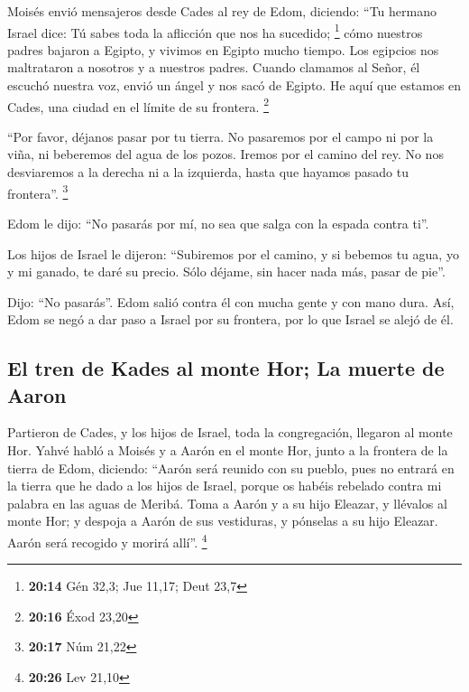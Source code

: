 \begin{paracol}{2}
 Moisés envió mensajeros desde Cades al rey de Edom,
diciendo: ``Tu hermano Israel dice: Tú sabes toda la aflicción que nos
ha sucedido; \footnote{\textbf{20:14} Gén 32,3; Jue 11,17; Deut 23,7}
 cómo nuestros padres bajaron a Egipto, y vivimos en
Egipto mucho tiempo. Los egipcios nos maltrataron a nosotros y a
nuestros padres.  Cuando clamamos al Señor, él escuchó
nuestra voz, envió un ángel y nos sacó de Egipto. He aquí que estamos en
Cades, una ciudad en el límite de su frontera. \footnote{\textbf{20:16}
  Éxod 23,20}

 ``Por favor, déjanos pasar por tu tierra. No pasaremos
por el campo ni por la viña, ni beberemos del agua de los pozos. Iremos
por el camino del rey. No nos desviaremos a la derecha ni a la
izquierda, hasta que hayamos pasado tu frontera''. \footnote{\textbf{20:17}
  Núm 21,22}

 Edom le dijo: ``No pasarás por mí, no sea que salga con
la espada contra ti''.

 Los hijos de Israel le dijeron: ``Subiremos por el
camino, y si bebemos tu agua, yo y mi ganado, te daré su precio. Sólo
déjame, sin hacer nada más, pasar de pie''.

 Dijo: ``No pasarás''. Edom salió contra él con mucha
gente y con mano dura.  Así, Edom se negó a dar paso a
Israel por su frontera, por lo que Israel se alejó de él.

\hypertarget{el-tren-de-kades-al-monte-hor-la-muerte-de-aaron}{%
\subsection{El tren de Kades al monte Hor; La muerte de
Aaron}\label{el-tren-de-kades-al-monte-hor-la-muerte-de-aaron}}

 Partieron de Cades, y los hijos de Israel, toda la
congregación, llegaron al monte Hor.  Yahvé habló a
Moisés y a Aarón en el monte Hor, junto a la frontera de la tierra de
Edom, diciendo:  ``Aarón será reunido con su pueblo, pues
no entrará en la tierra que he dado a los hijos de Israel, porque os
habéis rebelado contra mi palabra en las aguas de Meribá.
 Toma a Aarón y a su hijo Eleazar, y llévalos al monte
Hor;  y despoja a Aarón de sus vestiduras, y pónselas a
su hijo Eleazar. Aarón será recogido y morirá allí''. \footnote{\textbf{20:26}
  Lev 21,10}


\end{paracol}
